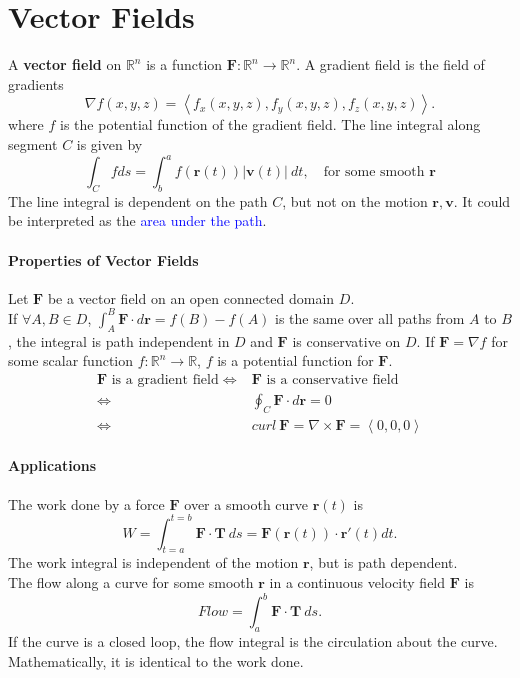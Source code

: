 \section{Vector Fields}
A \textcolor{Bittersweet}{\textbf{vector field}} on $\mathbb{R}^{n}$ is a
function $\mathbf{F}:\mathbb{R}^{n}\to\mathbb{R}^{n}$. A
\textcolor{Bittersweet}{gradient field} is the field of gradients
\[\nabla f\left(x,y,z\right)=\left<f_x\left( x,y,z \right), f_y\left( x,y,z
\right), f_z\left( x,y,z \right)  \right>.\]
where $f$ is the potential function of the gradient field.
The \textcolor{Bittersweet}{line integral} along segment $C$ is given by
\[\int_C f ds = \int_{{b}}^{{a}} {f\left(\mathbf{r}\left( t \right) \right)} \left| \mathbf{v}\left( t \right)  \right| \: d{t},\quad \text{for some smooth $\mathbf{r}$}\] 
The line integral is dependent on the path $C$, but not on the motion
$\mathbf{r},\mathbf{v}$. It could be interpreted as the \textcolor{Blue}{area
under the path}.
\paragraph{Properties of Vector Fields}
Let $\mathbf{F}$ be a vector field on an open connected domain $D$.\\
If $\forall A,B\in D$, 
$\int_{{A}}^{{B}} {\mathbf{F}\cdot} d{\mathbf{r}} {}=f(B)-f(A)$
is the same over all paths from $A$ to $B$, the integral is
\textcolor{Bittersweet}{path independent} in $D$ and $\mathbf{F}$ is
\textcolor{Bittersweet}{conservative} on $D$. If $\mathbf{F}=\nabla f$ for some
scalar function $f:\mathbb{R}^{n}\to \mathbb{R}$, $f$ is a potential function
for $\mathbf{F}$.
\begin{align*}
  \mathbf{F}\text{ is a gradient field}\iff& \mathbf{F}\text{ is a conservative
field}\\
    \iff& \oint_C \mathbf{F}\cdot d{\mathbf{r}=0}\\
    \iff& curl\:{\mathbf{F}}=\nabla \times \mathbf{F}=\left<0,0,0 \right> 
\end{align*}

\paragraph{Applications}
The \textcolor{Bittersweet}{work done} by a force $\mathbf{F}$ over a smooth
curve $\mathbf{r}\left( t \right)$ is
\[W=\int_{{t=a}}^{{t=b}} {\mathbf{F\cdot T}} \: d{s} {}=\mathbf{F}\left( \mathbf{r}\left( t \right)  \right)\cdot \mathbf{r}'\left( t \right)dt.\]
The work integral is independent of the motion $\mathbf{r}$, but is path
dependent.\\
The \textcolor{Bittersweet}{flow} along a curve for some smooth $\mathbf{r}$ in
a continuous velocity field $\mathbf{F}$ is
\[Flow=\int_{{a}}^{{b}} {\mathbf{F\cdot T}} \: d{s} {}.\] 
If the curve is a closed loop, the flow integral is the
\textcolor{Bittersweet}{circulation about the curve}. Mathematically, it is
identical to the work done.

